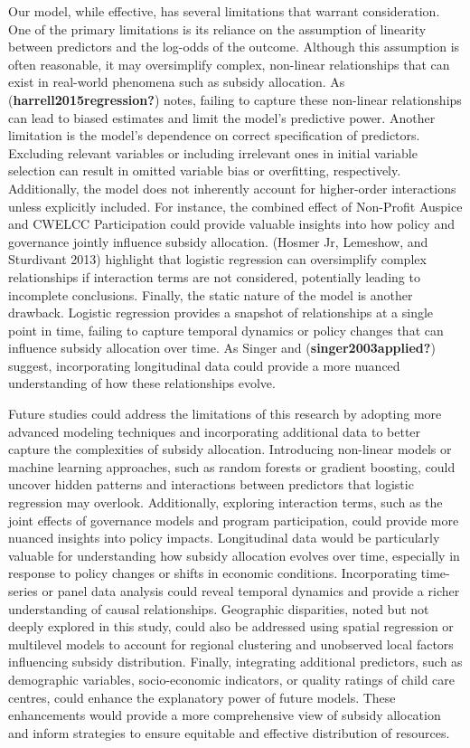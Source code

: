 \documentclass[
  letterpaper,
  DIV=11,
  numbers=noendperiod]{scrartcl}
\begin{document}
Our model, while effective, has several limitations that warrant
consideration. One of the primary limitations is its reliance on the
assumption of linearity between predictors and the log-odds of the
outcome. Although this assumption is often reasonable, it may
oversimplify complex, non-linear relationships that can exist in
real-world phenomena such as subsidy allocation. As
(\textbf{harrell2015regression?}) notes, failing to capture these
non-linear relationships can lead to biased estimates and limit the
model's predictive power. Another limitation is the model's dependence
on correct specification of predictors. Excluding relevant variables or
including irrelevant ones in initial variable selection can result in
omitted variable bias or overfitting, respectively. Additionally, the
model does not inherently account for higher-order interactions unless
explicitly included. For instance, the combined effect of Non-Profit
Auspice and CWELCC Participation could provide valuable insights into
how policy and governance jointly influence subsidy allocation. (Hosmer
Jr, Lemeshow, and Sturdivant 2013) highlight that logistic regression
can oversimplify complex relationships if interaction terms are not
considered, potentially leading to incomplete conclusions. Finally, the
static nature of the model is another drawback. Logistic regression
provides a snapshot of relationships at a single point in time, failing
to capture temporal dynamics or policy changes that can influence
subsidy allocation over time. As Singer and
(\textbf{singer2003applied?}) suggest, incorporating longitudinal data
could provide a more nuanced understanding of how these relationships
evolve.

Future studies could address the limitations of this research by
adopting more advanced modeling techniques and incorporating additional
data to better capture the complexities of subsidy allocation.
Introducing non-linear models or machine learning approaches, such as
random forests or gradient boosting, could uncover hidden patterns and
interactions between predictors that logistic regression may overlook.
Additionally, exploring interaction terms, such as the joint effects of
governance models and program participation, could provide more nuanced
insights into policy impacts. Longitudinal data would be particularly
valuable for understanding how subsidy allocation evolves over time,
especially in response to policy changes or shifts in economic
conditions. Incorporating time-series or panel data analysis could
reveal temporal dynamics and provide a richer understanding of causal
relationships. Geographic disparities, noted but not deeply explored in
this study, could also be addressed using spatial regression or
multilevel models to account for regional clustering and unobserved
local factors influencing subsidy distribution. Finally, integrating
additional predictors, such as demographic variables, socio-economic
indicators, or quality ratings of child care centres, could enhance the
explanatory power of future models. These enhancements would provide a
more comprehensive view of subsidy allocation and inform strategies to
ensure equitable and effective distribution of resources.
\end{document}
